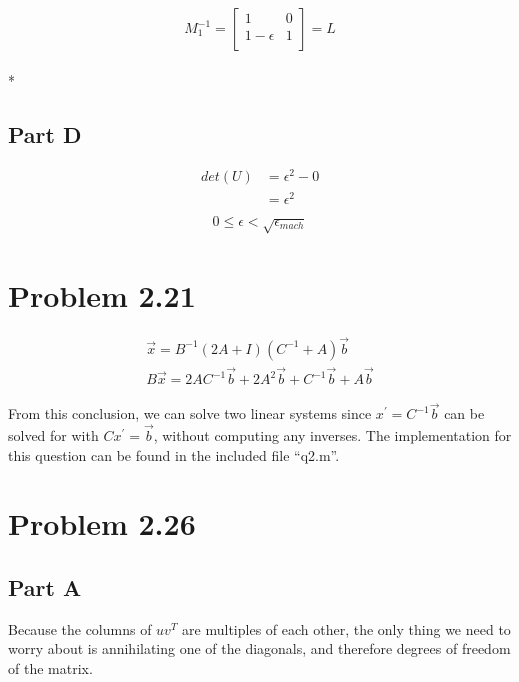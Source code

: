 \documentclass[paper=a4, fontsize=11pt]{scrartcl} %
\numberwithin{equation}{section} %
\numberwithin{figure}{section} %
\numberwithin{table}{section} %
\begin{document}
$$M_1^{-1} =
\left[\begin{array}{cc}
1 & 0\\
1 - \epsilon & 1\\
\end{array}\right] = L$$ \\*

\subsection{Part D}
\begin{align*}
	det(U) &= \epsilon^2 - 0 \\
		   &= \epsilon^2 \\
\end{align*}
\begin{align*}
	0 \leq \epsilon < \sqrt{\epsilon_{mach}}
\end{align*}


\section*{Problem 2.21}
\begin{align*}
	\vec{x} = B^{-1}(2A + I)(C^{-1} + A)\vec{b} \\
	B\vec{x} = 2AC^{-1}\vec{b} + 2A^2\vec{b} + C^{-1}\vec{b} + A\vec{b}
\end{align*}

From this conclusion, we can solve two linear systems since $x^\prime = C^{-1}\vec{b}$ can be solved for with $Cx^\prime = \vec{b}$, without computing any inverses. The implementation for this question can be found in the included file ``q2.m''.



\section*{Problem 2.26}
\subsection*{Part A}
Because the columns of $uv^T$ are multiples of each other, the only thing we need to worry about is annihilating one of the diagonals, and therefore degrees of freedom of the matrix.
\end{document}
